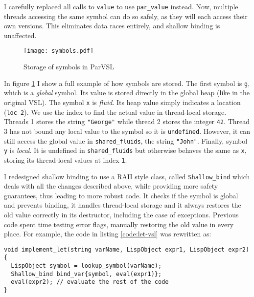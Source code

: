 I carefully replaced all calls to \texttt{value} to use \texttt{par\_value} instead.
Now, multiple threads accessing the same symbol can do so safely,
as they will each access their own versions. This eliminates data races entirely,
and shallow binding is unaffected.

\begin{figure}[H]
  \centering
  \texttt{[image: symbols.pdf]}
  \caption{Storage of symbols in ParVSL}
  \label{fig:symbols}
\end{figure}

In figure \ref{fig:symbols} I show a full example of how symbols are stored. The first symbol is \texttt{g}, which
is a \emph{global} symbol. Its value is stored directly in the global heap (like in the original VSL). The symbol \texttt{x}
is \emph{fluid}. Its heap value simply indicates a location (\texttt{loc 2}). We use the index to find the actual value
in thread-local storage. Threads 1 stores the string \texttt{"George"} while thread 2 stores the integer \texttt{42}.
Thread 3 has not bound any local value to the symbol so it is \texttt{undefined}. However, it can still access the
global value in \verb|shared_fluids|, the string \verb|"John"|. Finally, symbol \verb|y| is \emph{local}. It is
undefined in \verb|shared_fluids| but otherwise behaves the same as \verb|x|, storing its thread-local values at
index \verb|1|.

I redesigned shallow binding to use a RAII style class, called \verb|Shallow_bind| which deals with all the changes
described above, while providing more safety guarantees, thus leading to more robust code. It checks if the symbol is global and prevents binding,
it handles thread-local storage and it always restores the old value correctly in its destructor, including the
case of exceptions. Previous code spent time testing error flags, manually restoring the old value in every place.
For example, the code in listing \ref{code:let-vsl} was rewritten as:
\begin{code}
\begin{verbatim}
void implement_let(string varName, LispObject expr1, LispObject expr2) {
  LispObject symbol = lookup_symbol(varName);
  Shallow_bind bind_var{symbol, eval(expr1)};
  eval(expr2); // evaluate the rest of the code
}
\end{verbatim}
  \caption{Implementation of \texttt{let} in ParVSL.}
  \label{code:let-parvsl}
\end{code}

